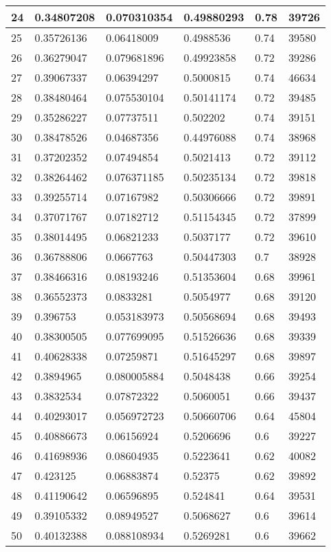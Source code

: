 \begin{longtable}{|l|l|l|l|l|l|}
24 & 0.34807208 & 0.070310354 & 0.49880293 & 0.78 & 39726 \\ \hline 
25 & 0.35726136 & 0.06418009 & 0.4988536 & 0.74 & 39580 \\ \hline 
26 & 0.36279047 & 0.079681896 & 0.49923858 & 0.72 & 39286 \\ \hline 
27 & 0.39067337 & 0.06394297 & 0.5000815 & 0.74 & 46634 \\ \hline 
28 & 0.38480464 & 0.075530104 & 0.50141174 & 0.72 & 39485 \\ \hline 
29 & 0.35286227 & 0.07737511 & 0.502202 & 0.74 & 39151 \\ \hline 
30 & 0.38478526 & 0.04687356 & 0.44976088 & 0.74 & 38968 \\ \hline 
31 & 0.37202352 & 0.07494854 & 0.5021413 & 0.72 & 39112 \\ \hline 
32 & 0.38264462 & 0.076371185 & 0.50235134 & 0.72 & 39818 \\ \hline 
33 & 0.39255714 & 0.07167982 & 0.50306666 & 0.72 & 39891 \\ \hline 
34 & 0.37071767 & 0.07182712 & 0.51154345 & 0.72 & 37899 \\ \hline 
35 & 0.38014495 & 0.06821233 & 0.5037177 & 0.72 & 39610 \\ \hline 
36 & 0.36788806 & 0.0667763 & 0.50447303 & 0.7 & 38928 \\ \hline 
37 & 0.38466316 & 0.08193246 & 0.51353604 & 0.68 & 39961 \\ \hline 
38 & 0.36552373 & 0.0833281 & 0.5054977 & 0.68 & 39120 \\ \hline 
39 & 0.396753 & 0.053183973 & 0.50568694 & 0.68 & 39493 \\ \hline 
40 & 0.38300505 & 0.077699095 & 0.51526636 & 0.68 & 39339 \\ \hline 
41 & 0.40628338 & 0.07259871 & 0.51645297 & 0.68 & 39897 \\ \hline 
42 & 0.3894965 & 0.080005884 & 0.5048438 & 0.66 & 39254 \\ \hline 
43 & 0.3832534 & 0.07872322 & 0.5060051 & 0.66 & 39437 \\ \hline 
44 & 0.40293017 & 0.056972723 & 0.50660706 & 0.64 & 45804 \\ \hline 
45 & 0.40886673 & 0.06156924 & 0.5206696 & 0.6 & 39227 \\ \hline 
46 & 0.41698936 & 0.08604935 & 0.5223641 & 0.62 & 40082 \\ \hline 
47 & 0.423125 & 0.06883874 & 0.52375 & 0.62 & 39892 \\ \hline 
48 & 0.41190642 & 0.06596895 & 0.524841 & 0.64 & 39531 \\ \hline 
49 & 0.39105332 & 0.08949527 & 0.5068627 & 0.6 & 39614 \\ \hline 
50 & 0.40132388 & 0.088108934 & 0.5269281 & 0.6 & 39662 \\ \hline 
\end{longtable}